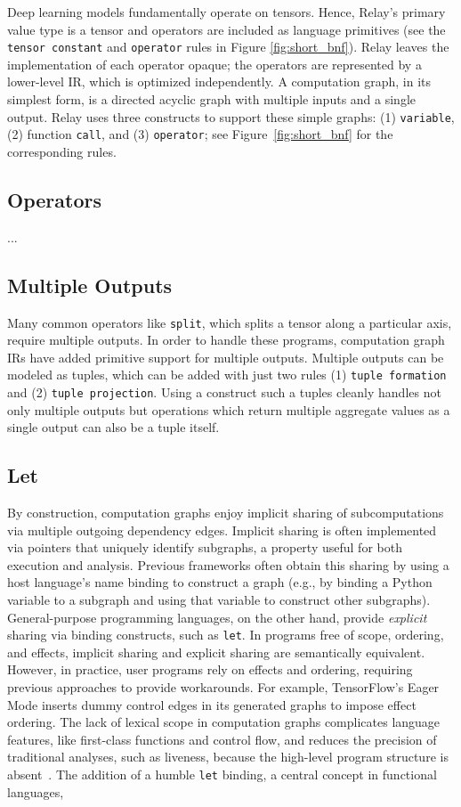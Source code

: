 Deep learning models fundamentally operate on tensors.
Hence, Relay's primary value type is a tensor and operators are included as language primitives
  (see the \verb|tensor constant| and \verb|operator| rules in Figure \ref{fig:short_bnf}).
Relay leaves the implementation of each operator opaque; the operators
  are represented by a lower-level IR, which is optimized independently.
A computation graph, in its simplest form, is a directed acyclic
  graph with multiple inputs and a single output.
Relay uses three constructs to support these simple graphs:
  (1) \verb|variable|, (2) function \verb|call|,
  and (3) \verb|operator|; see Figure~\ref{fig:short_bnf} for the corresponding rules.

\subsection{Operators}
...

\subsection*{Multiple Outputs}

Many common operators like \verb|split|, which splits
  a tensor along a particular axis, require multiple outputs.
In order to handle these programs,
  computation graph IRs have added primitive support
  for multiple outputs.
Multiple outputs can be modeled as tuples, which can
  be added with just two rules (1) \verb|tuple formation|
  and (2) \verb|tuple projection|.
Using a construct such a tuples cleanly handles not only multiple
  outputs but operations which return multiple aggregate values
  as a single output can also be a tuple itself.

\subsection*{Let}

By construction, computation graphs enjoy implicit sharing of subcomputations
  via multiple outgoing dependency edges.
Implicit sharing is often implemented via pointers that uniquely identify subgraphs,
  a property useful for both execution and analysis.
Previous frameworks often obtain this sharing by using a host
  language's name binding to construct a graph (e.g., by binding a Python variable
  to a subgraph and using that variable to construct other subgraphs).
General-purpose programming languages, on the other hand, provide \textit{explicit}
  sharing via binding constructs, such as \verb|let|.
In programs free of scope, ordering, and effects, implicit sharing
  and explicit sharing are semantically equivalent.
However, in practice, user programs rely on effects and ordering,
  requiring previous approaches to provide workarounds.
For example, TensorFlow's Eager Mode inserts dummy control edges
  in its generated graphs to impose effect ordering.
The lack of lexical scope in computation graphs complicates language features,
  like first-class functions and control flow,
  and reduces the precision of traditional analyses,
  such as liveness,
  because the high-level program structure is absent~\citep{funarg, funarg_sol}.
The addition of a humble \verb|let| binding, a central concept in functional languages,


